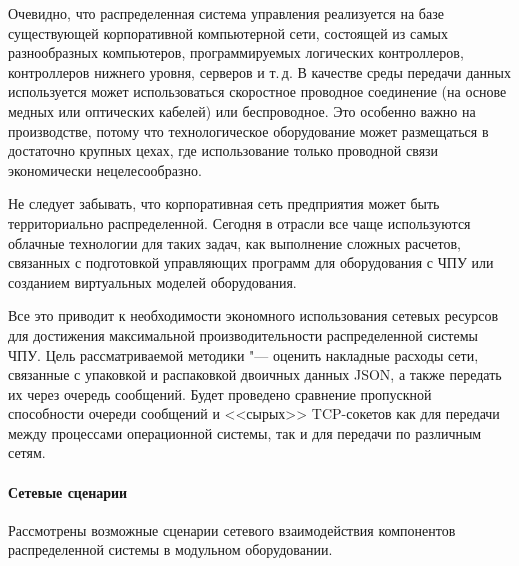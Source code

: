 Очевидно, что распределенная система управления реализуется на базе существующей корпоративной компьютерной сети, состоящей из самых разнообразных компьютеров, программируемых логических контроллеров, контроллеров нижнего уровня, серверов и т.\,д. В качестве среды передачи данных используется может использоваться скоростное проводное соединение (на основе медных или оптических кабелей) или беспроводное. Это особенно важно на производстве, потому что технологическое оборудование может размещаться в достаточно крупных цехах, где использование только проводной связи экономически нецелесообразно.

Не следует забывать, что корпоративная сеть предприятия может быть территориально распределенной. Сегодня в отрасли все чаще используются облачные технологии для таких задач, как выполнение сложных расчетов, связанных с подготовкой управляющих программ для оборудования с ЧПУ или созданием виртуальных моделей оборудования.

Все это приводит к необходимости экономного использования сетевых ресурсов для достижения максимальной производительности распределенной системы ЧПУ. Цель рассматриваемой методики "--- оценить накладные расходы сети, связанные с упаковкой и распаковкой двоичных данных JSON, а также передать их через очередь сообщений. Будет проведено сравнение пропускной способности очереди сообщений и <<сырых>> TCP-сокетов как для передачи между процессами операционной системы, так и для передачи по различным сетям.

\paragraph{Сетевые сценарии}

Рассмотрены возможные сценарии сетевого взаимодействия компонентов распределенной системы в модульном оборудовании.

